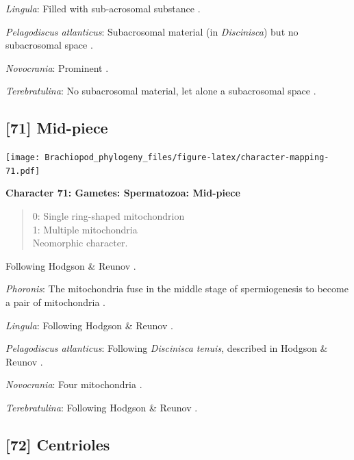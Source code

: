 \documentclass[openany]{book}
\theoremstyle{definition}
\theoremstyle{definition}
\theoremstyle{definition}
\theoremstyle{remark}
\begin{document}
\emph{Lingula}: Filled with sub-acrosomal substance
\citep{Fukumoto2003Theacrosome}.

\emph{Pelagodiscus atlanticus}: Subacrosomal material (in
\emph{Discinisca}) but no subacrosomal space
\citep{Hodgson1994Ultrastructureof}.

\emph{Novocrania}: Prominent \citep{Afzelius1978Finestructure}.

\emph{Terebratulina}: No subacrosomal material, let alone a subacrosomal
space \citep[e.g.][]{Hodgson1994Ultrastructureof}.

\hypertarget{mid-piece}{%
\subsection*{{[}71{]} Mid-piece}\label{mid-piece}}

\texttt{[image: Brachiopod\_phylogeny\_files/figure-latex/character-mapping-71.pdf]}

\textbf{Character 71: Gametes: Spermatozoa: Mid-piece}

\begin{quote}
0: Single ring-shaped mitochondrion\\
1: Multiple mitochondria\\
Neomorphic character.
\end{quote}

Following Hodgson \& Reunov \citeyearpar{Hodgson1994Ultrastructureof}.

\emph{Phoronis}: The mitochondria fuse in the middle stage of
spermiogenesis to become a pair of mitochondria
\citep{Reunov2004Ultrastructuralstudy}.

\emph{Lingula}: Following Hodgson \& Reunov
\citeyearpar{Hodgson1994Ultrastructureof}.

\emph{Pelagodiscus atlanticus}: Following \emph{Discinisca}
\emph{tenuis}, described in Hodgson \& Reunov
\citeyearpar{Hodgson1994Ultrastructureof}.

\emph{Novocrania}: Four mitochondria \citep{Afzelius1978Finestructure}.

\emph{Terebratulina}: Following Hodgson \& Reunov
\citeyearpar{Hodgson1994Ultrastructureof}.

\hypertarget{centrioles}{%
\subsection*{{[}72{]} Centrioles}\label{centrioles}}
\end{document}
